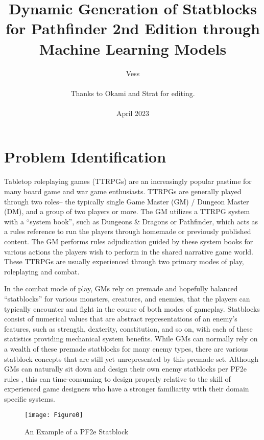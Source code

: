 \documentclass[11pt]{article}
\begin{document}
\title{Dynamic Generation of Statblocks for Pathfinder 2nd Edition through Machine Learning Models}

\author{Vess\\ \\Thanks to Okami and Strat for editing.\\ \\April 2023}
\date{}

\maketitle

\section{Problem Identification}

Tabletop roleplaying games (TTRPGs) are an increasingly popular pastime for many board game and war game enthusiasts. TTRPGs are generally played through two roles-- the typically single Game Master (GM) / Dungeon Master (DM), and a group of two players or more. The GM utilizes a TTRPG system with a ``system book'', such as Dungeons \& Dragons or Pathfinder, which acts as a rules reference to run the players through homemade or previously published content. The GM performs rules adjudication guided by these system books for various actions the players wish to perform in the shared narrative game world. These TTRPGs are usually experienced through two primary modes of play, roleplaying and combat.

In the combat mode of play, GMs rely on premade and hopefully balanced ``statblocks'' for various monsters, creatures, and enemies, that the players can typically encounter and fight in the course of both modes of gameplay. Statblocks consist of numerical values that are abstract representations of an enemy's features, such as strength, dexterity, constitution, and so on, with each of these statistics providing mechanical system benefits. While GMs can normally rely on a wealth of these premade statblocks for many enemy types, there are various statblock concepts that are still yet unrepresented by this premade set. Although GMs can naturally sit down and design their own enemy statblocks per PF2e rules \cite{building}, this can time-consuming to design properly relative to the skill of experienced game designers who have a stronger familiarity with their domain specific systems.

\begin{figure}[H]
    \centering
    \texttt{[image: Figure0]}
    \caption{An Example of a PF2e Statblock}
    \label{fig:my_label}
\end{figure}
\end{document}
